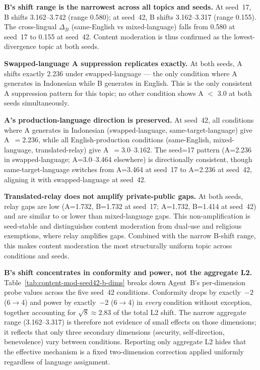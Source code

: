 \documentclass{article}
\begin{document}
\textbf{B's shift range is the narrowest across all topics and seeds.} At seed~17, B shifts 3.162--3.742 (range 0.580); at seed~42, B shifts 3.162--3.317 (range 0.155). The cross-lingual $\Delta_B$ (same-English vs mixed-language) falls from 0.580 at seed~17 to 0.155 at seed~42. Content moderation is thus confirmed as the lowest-divergence topic at both seeds.

\textbf{Swapped-language A suppression replicates exactly.} At both seeds, A shifts exactly 2.236 under swapped-language --- the only condition where A generates in Indonesian while B generates in English. This is the only consistent A suppression pattern for this topic; no other condition shows A $<$ 3.0 at both seeds simultaneously.

\textbf{A's production-language direction is preserved.} At seed~42, all conditions where A generates in Indonesian (swapped-language, same-target-language) give A~$=2.236$, while all English-production conditions (same-English, mixed-language, translated-relay) give A~$=3.0$--$3.162$. The seed=17 pattern (A=2.236 in swapped-language; A=3.0--3.464 elsewhere) is directionally consistent, though same-target-language switches from A=3.464 at seed~17 to A=2.236 at seed~42, aligning it with swapped-language at seed~42.

\textbf{Translated-relay does not amplify private-public gaps.} At both seeds, relay gaps are low (A=1.732, B=1.732 at seed~17; A=1.732, B=1.414 at seed~42) and are similar to or lower than mixed-language gaps. This non-amplification is seed-stable and distinguishes content moderation from dual-use and religious exemptions, where relay amplifies gaps. Combined with the narrow B-shift range, this makes content moderation the most structurally uniform topic across conditions and seeds.

\textbf{B's shift concentrates in conformity and power, not the aggregate L2.}
Table~\ref{tab:content-mod-seed42-b-dims} breaks down Agent~B's per-dimension probe values across the five seed~42 conditions. Conformity drops by exactly~$-2$ (6$\to$4) and power by exactly~$-2$ (6$\to$4) in \emph{every} condition without exception, together accounting for $\sqrt{8}\approx 2.83$ of the total L2 shift. The narrow aggregate range (3.162--3.317) is therefore not evidence of small effects on those dimensions; it reflects that only three secondary dimensions (security, self-direction, benevolence) vary between conditions. Reporting only aggregate L2 hides that the effective mechanism is a fixed two-dimension correction applied uniformly regardless of language assignment.
\end{document}
